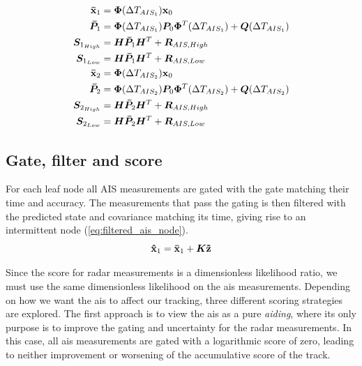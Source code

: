 \begin{equation}\label{eq:predicted_origin_state_ais_time}
\begin{split}
\boldsymbol{\mathbf{\bar{x}}}_1 	&= \bm{\Phi}(\Delta T_{AIS_1}) \boldsymbol{\mathbf{x}}_0 \\
\bm{\bar{P}}_1	&= \bm{\Phi}(\Delta T_{AIS_1}) \bm{P}_0 \bm{\Phi}^T(\Delta T_{AIS_1}) + \bm{Q}(\Delta T_{AIS_1}) \\
\bm{S}_{1_{High}}&= \bm{H} \bm{\bar{P}}_1 \bm{H}^T + \bm{R}_{AIS, High} \\
\bm{S}_{1_{Low}}	&= \bm{H} \bm{\bar{P}}_1 \bm{H}^T + \bm{R}_{AIS, Low} \\
\boldsymbol{\mathbf{\bar{x}}}_2 	&= \bm{\Phi}(\Delta T_{AIS_2}) \boldsymbol{\mathbf{x}}_0 \\
\bm{\bar{P}}_2	&= \bm{\Phi}(\Delta T_{AIS_2}) \bm{P}_0 \bm{\Phi}^T(\Delta T_{AIS_2}) + \bm{Q}(\Delta T_{AIS_2}) \\
\bm{S}_{2_{High}}&= \bm{H} \bm{\bar{P}}_2 \bm{H}^T + \bm{R}_{AIS, High} \\
\bm{S}_{2_{Low}}	&= \bm{H} \bm{\bar{P}}_2 \bm{H}^T + \bm{R}_{AIS, Low} \\
\end{split}
\end{equation}

\subsection{Gate, filter and score}\label{sec:ais_gate_filter_score}
For each leaf node all AIS measurements are gated with the gate matching their time and accuracy. The measurements that pass the gating is then filtered with the predicted state and covariance matching its time, giving rise to an intermittent node (\ref{eq:filtered_ais_node}).
\begin{equation}\label{eq:filtered_ais_node}
\boldsymbol{\mathbf{\hat{x}}}_1 = \boldsymbol{\mathbf{\bar{x}}}_1 + \bm{K} \boldsymbol{\mathbf{\tilde{z}}}
\end{equation}

Since the score for radar measurements is a dimensionless likelihood ratio, we must use the same dimensionless likelihood on the \gls{ais} measurements. Depending on how we want the \gls{ais} to affect our tracking, three different scoring strategies are explored. The first approach is to view the \gls{ais} as a pure \emph{aiding}, where its only purpose is to improve the gating and uncertainty for the radar measurements. In this case, all \gls{ais} measurements are gated with a logarithmic score of zero, leading to neither improvement or worsening of the accumulative score of the track.

